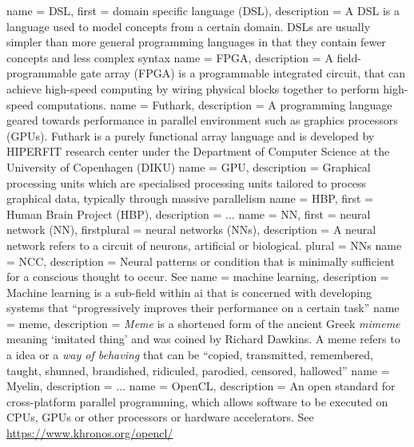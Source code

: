  {
  name = {DSL},
  first = {domain specific language (DSL)},
  description = {A DSL is a language used to model concepts from a certain
    domain. DSLs are usually simpler than more general programming languages in
    that they contain fewer concepts and less complex syntax}
}
 {
  name = {FPGA},
  description = {A field-programmable gate array (FPGA) is a programmable
		 integrated circuit, that can achieve high-speed computing
		 by wiring physical blocks together to perform high-speed
		 computations.}
}
 {
   name = {Futhark},
   description = {A programming language geared towards performance in parallel environment such as
   graphics processors (GPUs). Futhark is a purely functional array language and is
   developed by HIPERFIT research center under the Department of Computer Science at the
   University of Copenhagen (DIKU)}
}
 {
  name = GPU,
  description = {Graphical processing units which are specialised processing units
                 tailored to process graphical data, typically through massive parallelism}
}
 {
  name = HBP,
  first = {Human Brain Project (HBP)},
  description = {...}
}
 {
  name = {NN},
  first = {neural network (NN)},
  firstplural = {neural networks (NNs)},
  description = {A neural network refers to a circuit of neurons, artificial or biological.}
  plural = {NNs}
}
 {
   name = {NCC},
   description = {Neural patterns or condition that is minimally sufficient for a conscious
thought to occur. See \autocite{atkinson2000, Hohwy2009}}
}
 {
  name = machine learning,
  description = {Machine learning is a sub-field within \gls{ai} that is concerned
    with developing systems that ``progressively improves their performance on a
    certain task'' \autocite{wiki:ml}}
}
 {
name = meme,
description = {\textit{Meme} is a shortened form of the ancient Greek \textit{mimeme} meaning
`imitated thing' and was coined by Richard Dawkins. A meme refers to a idea or a
\textit{way of behaving} that can be \enquote{copied, transmitted, remembered, taught, shunned,
brandished, ridiculed, parodied, censored, hallowed} \autocite{dennett2017}}
}
 {
  name = Myelin,
  description = {...}
}
 {
   name = {OpenCL},
   description = {An open standard for cross-platform parallel programming, which
   allows software to be executed on CPUs, GPUs or other processors or hardware accelerators. See \url{
   https://www.khronos.org/opencl/}}
}
